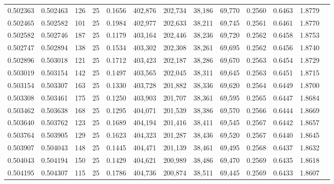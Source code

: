 \begin{tabular}{rrrrrrrrrrrrr}
0.502363 & 0.502463 &   126 &  25 &                                     0.1656 & 402,876 & 202,734 &  38,186 &  69,770 & 0.2560 & 0.6463 & 1.8779 \\
0.502465 & 0.502582 &   101 &  25 &                                     0.1984 & 402,977 & 202,633 &  38,211 &  69,745 & 0.2561 & 0.6461 & 1.8770 \\
0.502582 & 0.502746 &   187 &  25 &                                     0.1179 & 403,164 & 202,446 &  38,236 &  69,720 & 0.2562 & 0.6458 & 1.8753 \\
0.502747 & 0.502894 &   138 &  25 &                                     0.1534 & 403,302 & 202,308 &  38,261 &  69,695 & 0.2562 & 0.6456 & 1.8740 \\
0.502896 & 0.503018 &   121 &  25 &                                     0.1712 & 403,423 & 202,187 &  38,286 &  69,670 & 0.2563 & 0.6454 & 1.8729 \\
0.503019 & 0.503154 &   142 &  25 &                                     0.1497 & 403,565 & 202,045 &  38,311 &  69,645 & 0.2563 & 0.6451 & 1.8715 \\
0.503154 & 0.503307 &   163 &  25 &                                     0.1330 & 403,728 & 201,882 &  38,336 &  69,620 & 0.2564 & 0.6449 & 1.8700 \\
0.503308 & 0.503461 &   175 &  25 &                                     0.1250 & 403,903 & 201,707 &  38,361 &  69,595 & 0.2565 & 0.6447 & 1.8684 \\
0.503462 & 0.503638 &   168 &  25 &                                     0.1295 & 404,071 & 201,539 &  38,386 &  69,570 & 0.2566 & 0.6444 & 1.8669 \\
0.503640 & 0.503762 &   123 &  25 &                                     0.1689 & 404,194 & 201,416 &  38,411 &  69,545 & 0.2567 & 0.6442 & 1.8657 \\
0.503764 & 0.503905 &   129 &  25 &                                     0.1623 & 404,323 & 201,287 &  38,436 &  69,520 & 0.2567 & 0.6440 & 1.8645 \\
0.503907 & 0.504043 &   148 &  25 &                                     0.1445 & 404,471 & 201,139 &  38,461 &  69,495 & 0.2568 & 0.6437 & 1.8632 \\
0.504043 & 0.504194 &   150 &  25 &                                     0.1429 & 404,621 & 200,989 &  38,486 &  69,470 & 0.2569 & 0.6435 & 1.8618 \\
0.504195 & 0.504307 &   115 &  25 &                                     0.1786 & 404,736 & 200,874 &  38,511 &  69,445 & 0.2569 & 0.6433 & 1.8607 \\

\end{tabular}
